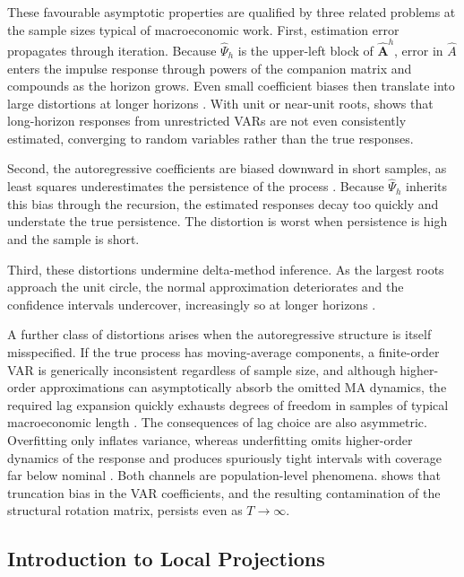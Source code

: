 These favourable asymptotic properties are qualified by three related problems at the sample sizes
typical of macroeconomic work. First, estimation error propagates through iteration. Because
$\hat{\Psi}_h$ is the upper-left block of $\hat{\mathbf{A}}^h$, error in $\hat{A}$ enters the
impulse response through powers of the companion matrix and compounds as the horizon grows. Even
small coefficient biases then translate into large distortions at longer horizons
\parencite{kilian1998small}. With unit or near-unit roots, \textcite{phillips1998impulse} shows
that long-horizon responses from unrestricted VARs are not even consistently estimated, converging
to random variables rather than the true responses.

Second, the autoregressive coefficients are biased downward in short samples, as least squares
underestimates the persistence of the process
\parencites{marriott1954bias}{nicholls1988bias}{pope1990biases}. Because $\hat{\Psi}_h$ inherits
this bias through the recursion, the estimated responses decay too quickly and understate the true
persistence. The distortion is worst when persistence is high and the sample is short.

Third, these distortions undermine delta-method inference. As the largest roots approach the unit
circle, the normal approximation deteriorates and the confidence intervals undercover, increasingly
so at longer horizons \parencites{kilian1998small}{kilian1999finite}.

A further class of distortions arises when the autoregressive structure is itself misspecified. If
the true process has moving-average components, a finite-order VAR is generically inconsistent
regardless of sample size, and although higher-order approximations can asymptotically absorb the
omitted MA dynamics, the required lag expansion quickly exhausts degrees of freedom in samples of
typical macroeconomic length \parencite{braun1993misspecifications}. The consequences of lag choice
are also asymmetric. Overfitting only inflates variance, whereas underfitting omits higher-order
dynamics of the response and produces spuriously tight intervals with coverage far below nominal
\parencite{kilian2001impulse}. Both channels are population-level phenomena.
\textcite{ravenna2007vector} shows that truncation bias in the VAR coefficients, and the resulting
contamination of the structural rotation matrix, persists even as $T \to \infty$.

\subsection{Introduction to Local Projections}

